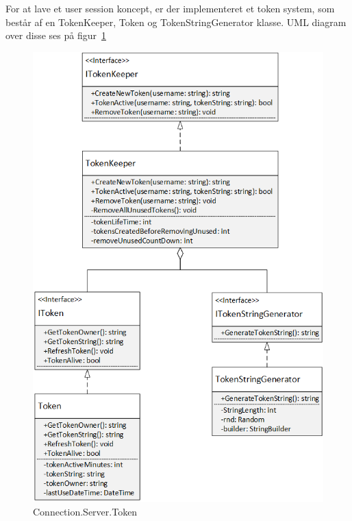 For at lave et user session koncept, er der implementeret et token system, som består af en TokenKeeper, Token og TokenStringGenerator klasse. UML diagram over disse ses på figur~\ref{fig:ConnectionServerToken}
\begin{figure}
\centering
\includegraphics[width=0.7\linewidth]{figs/connection/ConnectionServerToken.png}
\caption{Connection.Server.Token}
\label{fig:ConnectionServerToken}
\end{figure}

